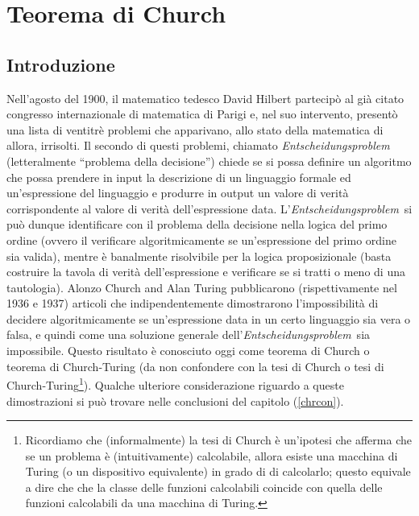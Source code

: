 


\newcommand{\godel}{G\"{o}del }
\newcommand{\ents}{\textit{Entscheidungsproblem}}

\chapter{Teorema di Church}

\section{Introduzione}

Nell'agosto del 1900, il matematico tedesco David Hilbert partecipò al già citato congresso internazionale di
 matematica di Parigi e, nel suo intervento, presentò una lista di ventitrè problemi che apparivano,
 allo stato della matematica di allora, irrisolti. Il secondo di questi problemi, chiamato \ents \, 
(letteralmente ``problema della decisione'') chiede se si possa definire un algoritmo che possa
 prendere in input la descrizione di un linguaggio formale ed un'espressione del linguaggio e produrre in
output un valore di verità corrispondente al valore di verità dell'espressione data. L'\ents \, si può dunque
identificare con il problema della decisione nella logica del primo ordine (ovvero il verificare algoritmicamente
se un'espressione del primo ordine sia valida), mentre è banalmente risolvibile per la logica proposizionale
(basta costruire la tavola di verità dell'espressione e verificare se si tratti o meno di una tautologia).
Alonzo Church and Alan Turing pubblicarono (rispettivamente nel 1936 e 1937) articoli che indipendentemente
dimostrarono l'impossibilità di decidere algoritmicamente se un'espressione data in un certo linguaggio 
sia vera o falsa, e quindi come una soluzione generale dell'\ents \, sia impossibile. Questo risultato è
conosciuto oggi come teorema di Church o teorema di Church-Turing (da non confondere con la tesi di Church
o tesi di Church-Turing\footnote{Ricordiamo che (informalmente) la tesi di Church è un'ipotesi
 che afferma che se un problema è (intuitivamente) calcolabile, allora esiste una macchina di Turing
 (o un dispositivo equivalente) in grado di di calcolarlo; questo equivale a dire che
 che la classe delle funzioni calcolabili coincide con quella delle funzioni 
calcolabili da una macchina di Turing. }). Qualche ulteriore considerazione riguardo a queste dimostrazioni
 si può trovare nelle conclusioni del capitolo (\ref{chrcon}).

